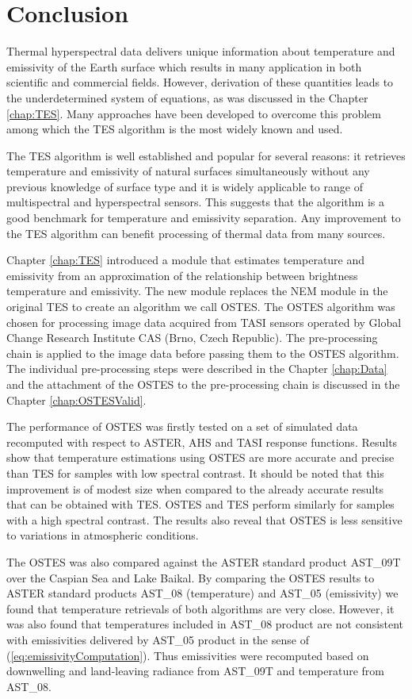 \chapter{Conclusion}

Thermal hyperspectral data delivers unique information about temperature and emissivity of the Earth surface which results in many application in both scientific and commercial fields. However, derivation of these quantities leads to the underdetermined system of equations, as was discussed in the Chapter \ref{chap:TES}. Many approaches have been developed to overcome this problem among which the TES algorithm is the most widely known and used. 

The TES algorithm is well established and popular for several reasons: it retrieves temperature and emissivity of natural surfaces simultaneously without any previous knowledge of surface type and it is widely applicable to range of multispectral and hyperspectral sensors. This suggests that the algorithm is a good benchmark for temperature and emissivity separation. Any improvement to the TES algorithm can benefit processing of thermal data from many sources.

Chapter \ref{chap:TES} introduced a module that estimates temperature and emissivity from an approximation of the relationship between brightness temperature and emissivity. The new module replaces the NEM module in the original TES to create an algorithm we call OSTES. The OSTES algorithm was chosen for processing image data acquired from TASI sensors operated by Global Change Research Institute CAS (Brno, Czech Republic). The pre-processing chain is applied to the image data before passing them to the OSTES algorithm. The individual pre-processing steps were described in the Chapter \ref{chap:Data} and the attachment of the OSTES to the pre-processing chain is discussed in the Chapter \ref{chap:OSTESValid}.

The performance of OSTES was firstly tested on a set of simulated data recomputed with respect to ASTER, AHS and TASI response functions. Results show that temperature estimations using OSTES are more accurate and precise than TES for samples with low spectral contrast. It should be noted that this improvement is of modest size when compared to the already accurate results that can be obtained with TES. OSTES and TES perform similarly for samples with a high spectral contrast. The results also reveal that OSTES is less sensitive to variations in atmospheric conditions.

The OSTES was also compared against the ASTER standard product AST\_09T over the Caspian Sea and Lake Baikal. By comparing the OSTES results to ASTER standard products AST\_08 (temperature) and AST\_05 (emissivity) we found that temperature retrievals of both algorithms are very close. However, it was also found that temperatures included in AST\_08 product are not consistent with emissivities delivered by AST\_05 product in the sense of (\ref{eq:emissivityComputation}). Thus emissivities were recomputed based on downwelling and land-leaving radiance from AST\_09T and temperature from AST\_08. 

